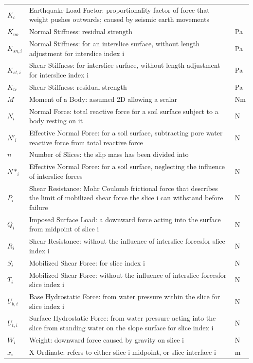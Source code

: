 \documentclass[12pt]{article}
\begin{document}
\begin{longtable*}{l l l}
\\
$K_{c}$ & Earthquake Load Factor: proportionality factor of force that weight pushes outwards; caused by seismic earth movements & 
\\
$K_{no}$ & Normal Stiffness: residual strength & Pa
\\
$K_{sn,i}$ & Normal Stiffness: for an interslice surface, without length adjustment for interslice index i & Pa
\\
$K_{st,i}$ & Shear Stiffness: for interslice surface, without length adjustment for interslice index i & Pa
\\
$K_{tr}$ & Shear Stiffness: residual strength & Pa
\\
$M$ & Moment of a Body: assumed 2D allowing a scalar & Nm
\\
$N_{i}$ & Normal Force: total reactive force for a soil surface subject to a body resting on it & N
\\
$N'_{i}$ & Effective Normal Force: for a soil surface, subtracting pore water reactive force from total reactive force & N
\\
$n$ & Number of Slices: the slip mass has been divided into & 
\\
$N*_{i}$ & Effective Normal Force: for a soil surface, neglecting the influence of interslice forces & N
\\
$P_{i}$ & Shear Resistance: Mohr Coulomb frictional force that describes the limit of mobilized shear force the slice i can withstand before failure & N
\\
$Q_{i}$ & Imposed Surface Load: a downward force acting into the surface from midpoint of slice i & N
\\
$R_{i}$ & Shear Resistance: without the influence of interslice forcesfor slice index i & N
\\
$S_{i}$ & Mobilized Shear Force: for slice index i & N
\\
$T_{i}$ & Mobilized Shear Force: without the influence of interslice forcesfor slice index i & N
\\
$U_{b,i}$ & Base Hydrostatic Force: from water pressure within the slice for slice index i & N
\\
$U_{t,i}$ & Surface Hydrostatic Force: from water pressure acting into the slice from standing water on the slope surface for slice index i & N
\\
$W_{i}$ & Weight: downward force caused by gravity on slice i & N
\\
$x_{i}$ & X Ordinate: refers to either slice i midpoint, or slice interface i & m

\end{longtable*}
\end{document}
